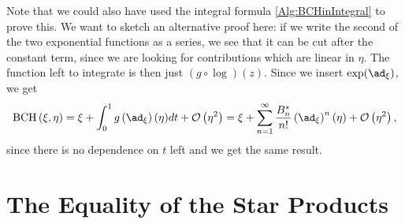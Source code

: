 \begin{remark}
	Note that we could also have used the integral formula 
	\eqref{Alg:BCHinIntegral} to prove this. We want to sketch an alternative 
	proof here: if we write the second of the two exponential functions as a 
	series, we see that it can be cut after the constant term, since we are 
	looking for contributions which are linear in $\eta$. The function left to 
	integrate is then just $(g \circ \log)(z)$. Since we insert 
	$\exp(\ad_{\xi})$, we get
	\begin{equation*}
		\bch{\xi}{\eta}
		=
		\xi + 
		\int_0^1
		g \left( \ad_{\xi} \right)
		(\eta)
		dt
		+ \mathcal{O} \left( \eta^2 \right)
		=
		\xi +
		\sum\limits_{n = 1}^{\infty}
		\frac{B_n^*}{n!}
		\left( \ad_{\xi} \right)^n (\eta)
		+ \mathcal{O} \left( \eta^2 \right),
	\end{equation*}
	since there is no dependence on $t$ left and we get the same result.
\end{remark}



\section{The Equality of the Star Products}
\label{sec:chap3_StarProductProof}


